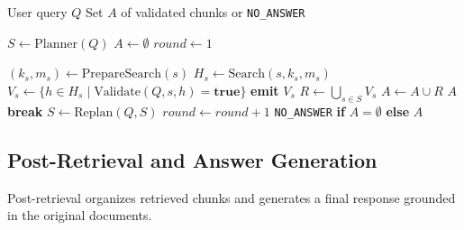 \documentclass[final,5p,times,twopage,twocolumn,a4paper]{elsarticle}
\begin{document}
\begin{algorithm}[!hbt]
\caption{End-to-End Planning $\rightarrow$ Hybrid Retrieval $\rightarrow$ Validation Pipeline}
\label{alg:full_pipeline}
\begin{algorithmic}[1]
\Require User query $Q$
\Ensure Set $A$ of validated chunks or \texttt{NO\_ANSWER}

\State $S \gets \text{Planner}(Q)$ 
\State $A \gets \emptyset$ 
\State $\textit{round} \gets 1$

        \State $(k_s, m_s) \gets \text{PrepareSearch}(s)$ 
        \State $H_s \gets \text{Search}(s, k_s, m_s)$ 
        \State $V_s \gets \{ h \in H_s \mid \text{Validate}(Q, s, h) = \textbf{true} \}$
        \State \textbf{emit} $V_s$ 
    \EndFor
    \State $R \gets \bigcup_{s \in S} V_s$
    \State $A \gets A \cup R$
        \State \Return $A$
    \EndIf
        \State \textbf{break}
    \EndIf
    \State $S \gets \text{Replan}(Q, S)$ 
    \State $\textit{round} \gets \textit{round} + 1$
\EndWhile
\State \Return \texttt{NO\_ANSWER} \textbf{if} $A = \emptyset$ \textbf{else} $A$
\end{algorithmic}
\end{algorithm}
%

\subsection{Post-Retrieval and Answer Generation}
Post-retrieval organizes retrieved chunks and generates a final response grounded in the original documents.


\end{document}
